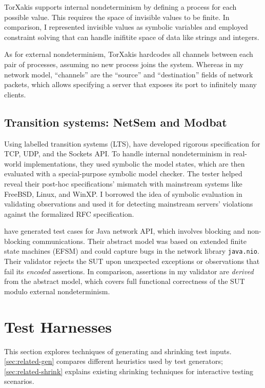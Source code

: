 TorXakis supports internal nondeterminism by defining a process for each
possible value.  This requires the space of invisible values to be finite.  In
comparison, I represented invisible values as symbolic variables and employed
constraint solving that can handle inifitite space of data like strings and
integers.

As for external nondeterminism, TorXakis hardcodes all channels between each
pair of processes, assuming no new process joins the system.  Whereas in my
network model, ``channels'' are the ``source'' and ``destination'' fields of
network packets, which allows specifying a server that exposes its port to
infinitely many clients.

\subsection{Transition systems: NetSem and Modbat}
Using labelled transition systems (LTS), \citet{netsem} have developed rigorous
specification for TCP, UDP, and the Sockets API.  To handle internal
nondeterminism in real-world implementations, they used symbolic the model
states, which are then evaluated with a special-purpose symbolic model checker.
The tester helped reveal their post-hoc specifications' mismatch with mainstream
systems like FreeBSD, Linux, and WinXP.  I borrowed the idea of symbolic
evaluation in validating observations and used it for detecting mainstream
servers' violations against the formalized RFC specification.

\citet{modbat} have generated test cases for Java network API, which involves
blocking and non-blocking communications.  Their abstract model was based on
extended finite state machines (EFSM) and could capture bugs in the network
library \verb|java.nio|.  Their validator rejects the SUT upon unexpected
exceptions or observations that fail its {\em encoded} assertions.  In
comparison, assertions in my validator are {\em derived} from the abstract
model, which covers full functional correctness of the SUT modulo external
nondeterminism.

\section{Test Harnesses}
\label{sec:related-harness}
This section explores techniques of generating and shrinking test inputs.
\autoref{sec:related-gen} compares different heuristics used by test generators;
\autoref{sec:related-shrink} explains existing shrinking techniques for
interactive testing scenarios.

